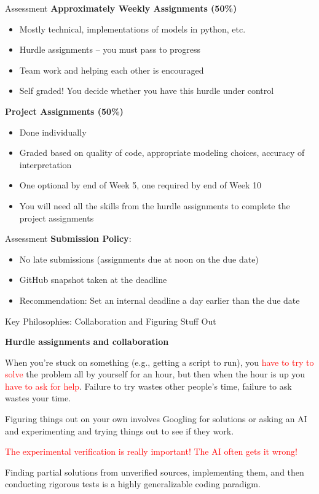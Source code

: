 \documentclass[aspectratio=169]{beamer}
\renewcommand{\emph}[1]{\textcolor{red}{#1}}
\begin{document}
\begin{frame}{Assessment}
\textbf{Approximately Weekly Assignments (50\%)}
\begin{itemize}[<+->]
    \item Mostly technical, implementations of models in python, etc.
    \item Hurdle assignments -- you must pass to progress
    \item Team work and helping each other is encouraged
    \item Self graded!  You decide whether you have this hurdle under control
\end{itemize}\pause
\textbf{Project Assignments (50\%)}
\begin{itemize}[<+->]
    \item Done individually
    \item Graded based on quality of code, appropriate modeling choices, accuracy of interpretation
    \item One optional by end of Week 5, one required by end of Week 10
    \item You will need all the skills from the hurdle assignments to complete the project assignments
\end{itemize}
\end{frame}

\begin{frame}{Assessment}
\textbf{Submission Policy}:
\begin{itemize}[<+->]
    \item No late submissions (assignments due at noon on the due date)
    \item GitHub snapshot taken at the deadline
    \item Recommendation: Set an internal deadline a day earlier than the due date
\end{itemize}
\end{frame}

\begin{frame}{Key Philosophies: Collaboration and Figuring Stuff Out}

\textbf{Hurdle assignments and collaboration}

When you're stuck on something (e.g., getting a script to run), you \emph{have to try to solve} the problem all by yourself for an hour, but then when the hour is up you \emph{have to ask for help}. Failure to try wastes other people's time, failure to ask wastes your time.
\pause

Figuring things out on your own involves Googling for solutions or asking an AI and {experimenting and trying things out to see if they work}.
\pause

\emph{The experimental verification is really important! The AI often gets it wrong!}
\pause

Finding partial solutions from unverified sources, implementing them, and then conducting rigorous tests is a highly generalizable coding paradigm.

\end{frame}
\end{document}
